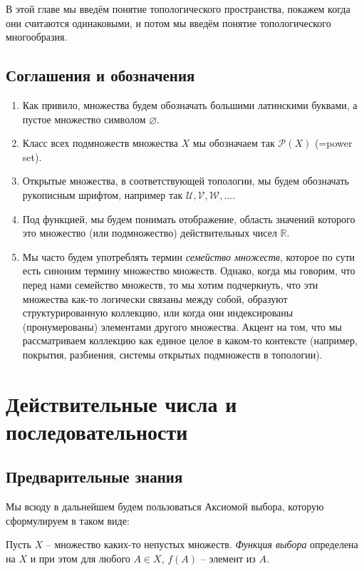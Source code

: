 В этой главе мы введём понятие топологического пространства, покажем когда они считаются одинаковыми, и потом мы введём понятие топологического многообразия.


\section*{Соглашения и обозначения}


\begin{enumerate}
    \item Как привило, множества будем обозначать большими латинскими буквами, а пустое множество символом $\varnothing$.
    \item Класс всех подмножеств множества $X$ мы обозначаем так $\mathscr{P}(X)$ (=power set).
    \item Открытые множества, в соответствующей топологии, мы будем обозначать рукописным шрифтом, например так $\mathscr{U}, \mathscr{V}, \mathscr{W},\ldots.$
    \item Под функцией, мы будем понимать отображение, область значений которого это множество (или подмножество) действительных чисел $\mathbb{R}$.
    \item Мы часто будем употреблять термин \textit{семейство множеств}, которое по сути есть синоним термину множество множеств. Однако, когда мы говорим, что перед нами семейство множеств, то мы хотим подчеркнуть, что эти множества как-то логически связаны между собой, образуют структурированную коллекцию, или когда они индексированы (пронумерованы) элементами другого множества. Акцент на том, что мы рассматриваем коллекцию как единое целое в каком-то контексте (например, покрытия, разбиения, системы открытых подмножеств в топологии).
\end{enumerate}

\chapter{Действительные числа и последовательности}

\section*{Предварительные знания}

Мы всюду в дальнейшем будем пользоваться Аксиомой выбора, которую сформулируем в таком виде:

Пусть $X$ -- множество каких-то непустых множеств. \textit{Функция выбора} определена на $X$ и при этом для любого $A \in X$, $f(A)$ -- элемент из $A$.

